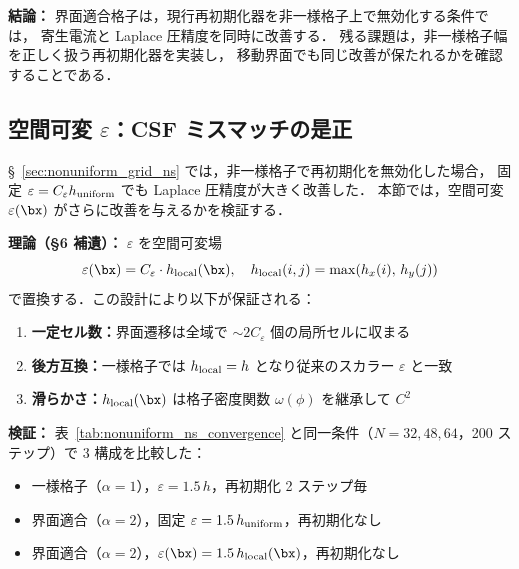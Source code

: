 \noindent\textbf{結論：}
界面適合格子は，現行再初期化器を非一様格子上で無効化する条件では，
寄生電流と Laplace 圧精度を同時に改善する．
残る課題は，非一様格子幅を正しく扱う再初期化器を実装し，
移動界面でも同じ改善が保たれるかを確認することである．


\subsection{\texorpdfstring{空間可変 $\varepsilon$：CSF ミスマッチの是正}{空間可変 epsilon：CSF ミスマッチの是正}}
\label{sec:local_eps_validation}

§~\ref{sec:nonuniform_grid_ns} では，非一様格子で再初期化を無効化した場合，
固定 $\varepsilon = C_\varepsilon h_{\rm uniform}$ でも Laplace 圧精度が大きく改善した．
本節では，空間可変 $\varepsilon(\bx)$ がさらに改善を与えるかを検証する．

\noindent\textbf{理論（§6 補遺）：}
$\varepsilon$ を空間可変場
\begin{equation}
  \varepsilon(\bx) = C_\varepsilon \cdot h_{\rm local}(\bx),
  \quad h_{\rm local}(i,j) = \max(h_x(i),\, h_y(j))
  \label{eq:local_eps}
\end{equation}
で置換する．この設計により以下が保証される：
\begin{enumerate}[noitemsep]
  \item \textbf{一定セル数：}界面遷移は全域で $\sim 2C_\varepsilon$ 個の局所セルに収まる
  \item \textbf{後方互換：}一様格子では $h_{\rm local} = h$ となり従来のスカラー $\varepsilon$ と一致
  \item \textbf{滑らかさ：}$h_{\rm local}(\bx)$ は格子密度関数 $\omega(\phi)$ を継承して $C^2$
\end{enumerate}

\noindent\textbf{検証：}
表~\ref{tab:nonuniform_ns_convergence} と同一条件（$N = 32, 48, 64$，200 ステップ）で
3 構成を比較した：
\begin{itemize}[noitemsep]
  \item[\textbf{A:}] 一様格子（$\alpha = 1$），$\varepsilon = 1.5\,h$，再初期化 2 ステップ毎
  \item[\textbf{B:}] 界面適合（$\alpha = 2$），固定 $\varepsilon = 1.5\,h_{\rm uniform}$，再初期化なし
  \item[\textbf{C:}] 界面適合（$\alpha = 2$），$\varepsilon(\bx) = 1.5\,h_{\rm local}(\bx)$，再初期化なし
\end{itemize}

